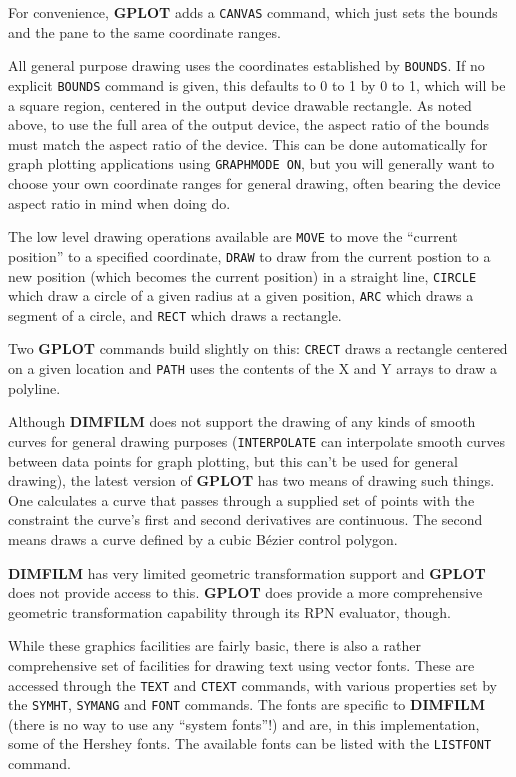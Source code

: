 \documentclass[a4paper,twoside,11pt]{article}
\newcommand{\newpara}{\par\vspace{4mm}\noindent}
\begin{document}
\newpara
For convenience, \textbf{GPLOT} adds a \texttt{CANVAS} command, which just sets
the bounds and the pane to the same coordinate ranges.

\newpara
All general purpose drawing uses the coordinates established by
\texttt{BOUNDS}. If no explicit \texttt{BOUNDS} command is given, this
defaults to 0 to 1 by 0 to 1, which will be a square region, centered in
the output device drawable rectangle. As noted above, to use the full
area of the output device, the aspect ratio of the bounds must match the
aspect ratio of the device. This can be done automatically for graph
plotting applications using \texttt{GRAPHMODE\ ON}, but you will
generally want to choose your own coordinate ranges for general drawing,
often bearing the device aspect ratio in mind when doing do.

\newpara
The low level drawing operations available are \texttt{MOVE} to move the
``current position'' to a specified coordinate, \texttt{DRAW} to draw
from the current postion to a new position (which becomes the current
position) in a straight line, \texttt{CIRCLE} which draw a circle of a
given radius at a given position, \texttt{ARC} which draws a segment of
a circle, and \texttt{RECT} which draws a rectangle.

\newpara
Two \textbf{GPLOT} commands build slightly on this: \texttt{CRECT} draws a
rectangle centered on a given location and \texttt{PATH} uses the
contents of the X and Y arrays to draw a polyline.

\newpara
Although \textbf{DIMFILM} does
not support the drawing of any kinds of smooth curves for general
drawing purposes (\texttt{INTERPOLATE} can interpolate smooth curves
between data points for graph plotting, but this can't be used for
general drawing), the latest version of \textbf{GPLOT} has two means
of drawing such things. One calculates a curve that passes through
a supplied set of points with the constraint the curve's first and
second derivatives are continuous. The second means draws a curve
defined by a cubic B\'{e}zier control polygon.

\newpara
\textbf{DIMFILM} has very limited geometric transformation support and \textbf{GPLOT} does
not provide access to this. \textbf{GPLOT} does provide a more comprehensive
geometric transformation capability through its RPN evaluator, though.

\newpara
While these graphics facilities are fairly basic, there is also a rather
comprehensive set of facilities for drawing text using vector fonts.
These are accessed through the \texttt{TEXT} and \texttt{CTEXT}
commands, with various properties set by the \texttt{SYMHT},
\texttt{SYMANG} and \texttt{FONT} commands. The fonts are specific to
\textbf{DIMFILM} (there is no way to use any ``system fonts''!) and are, in this
implementation, some of the Hershey fonts. The available fonts can be
listed with the \texttt{LISTFONT} command.
\end{document}
